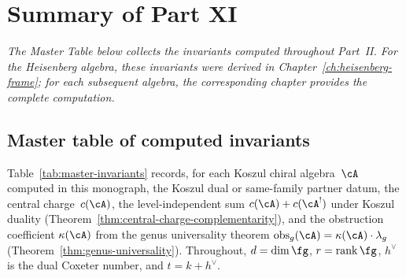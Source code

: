 \chapter*{Summary of Part XI}


\noindent\emph{The Master Table below collects the invariants computed throughout Part~II.  For the Heisenberg algebra, these invariants were derived in Chapter~\ref{ch:heisenberg-frame}; for each subsequent algebra, the corresponding chapter provides the complete computation.}

\section*{Master table of computed invariants}
\label{sec:master-table}

Table~\ref{tab:master-invariants} records, for each Koszul chiral
algebra~$\cA$ computed in this monograph, the Koszul dual or
same-family partner datum, the central charge~$c(\cA)$, the
level-independent sum $c(\cA) + c(\cA^!)$ under Koszul duality
(Theorem~\ref{thm:central-charge-complementarity}), and the
obstruction coefficient $\kappa(\cA)$ from the genus universality
theorem $\operatorname{obs}_g(\cA) = \kappa(\cA) \cdot \lambda_g$
(Theorem~\ref{thm:genus-universality}).
Throughout, $d = \dim\fg$, $r = \operatorname{rank}\fg$,
$h^\vee$ is the dual Coxeter number, and $t = k + h^\vee$.

